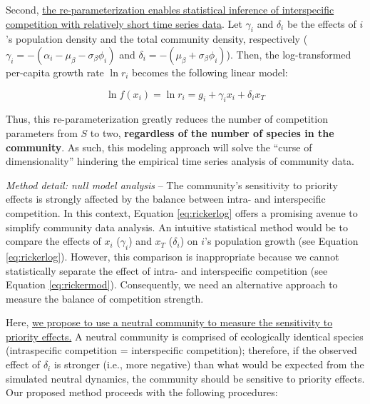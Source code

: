 \documentclass[12pt, class=article, crop=false]{standalone}
\begin{document}
Second, \ul{the re-parameterization enables statistical inference of interspecific competition with relatively short time series data}.
Let $\gamma_i$ and $\delta_i$ be the effects of $i$'s population density and the total community density, respectively ($\gamma_i = -(\alpha_i - \mu_{\beta} - \sigma_{\beta} \phi_i)$ and $\delta_i = -(\mu_{\beta} + \sigma_{\beta} \phi_i)$).
Then, the log-transformed per-capita growth rate $\ln r_i$ becomes the following linear model:

\begin{equation}
\label{eq:rickerlog}
    \ln f(x_i) = \ln r_i = g_i + \gamma_i x_i + \delta_i x_T
\end{equation}

Thus, this re-parameterization greatly reduces the number of competition parameters from $S$ to two, \textbf{regardless of the number of species in the community}.
As such, this modeling approach will solve the ``curse of dimensionality'' hindering the empirical time series analysis of community data.

\textit{Method detail: null model analysis} --
The community's sensitivity to priority effects is strongly affected by the balance between intra- and interspecific competition.
In this context, Equation \ref{eq:rickerlog} offers a promising avenue to simplify community data analysis. 
An intuitive statistical method would be to compare the effects of $x_i$ ($\gamma_i$) and $x_T$ ($\delta_i$) on $i$'s population growth (see Equation \ref{eq:rickerlog}).
However, this comparison is inappropriate because we cannot statistically separate the effect of intra- and interspecific competition (see Equation \ref{eq:rickermod}).
Consequently, we need an alternative approach to measure the balance of competition strength.

Here, \ul{we propose to use a neutral community to measure the sensitivity to priority effects.} 
A neutral community is comprised of ecologically identical species (intraspecific competition = interspecific competition); therefore, if the observed effect of $\delta_i$ is stronger (i.e., more negative) than what would be expected from the simulated neutral dynamics, the community should be sensitive to priority effects. Our proposed method proceeds with the following procedures:
\end{document}
